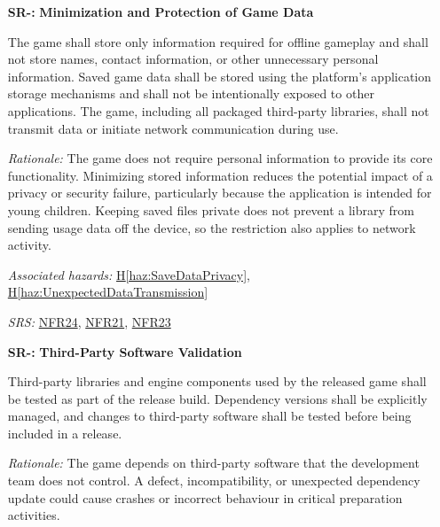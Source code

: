 \documentclass{article}
\newcounter{hazard}
\newcommand{\hazref}[1]{\hyperref[haz:#1]{H\ref*{haz:#1}}}
\newcounter{sr}
\newcommand{\srdef}[1]{\refstepcounter{sr}\label{sr:#1}\textbf{SR-\thesr:}}
\newcommand{\srsurl}{https://team-hindsight.github.io/ophthamology-game/SRS-IEEE/SRS.pdf}
\newcommand{\srsfrref}[2]{\href{\srsurl\#nameddest=#1}{FR#2}}
\newcommand{\srsnfrref}[2]{\href{\srsurl\#nameddest=#1}{NFR#2}}
\begin{document}
\begin{itemize}[leftmargin=1.5cm, labelwidth=1.3cm, labelsep=0.2cm,
  align=left, itemsep=1.2em, parsep=0.6em]
\textit{Rationale:}
Corrupted save data could cause the child to
lose completed preparation activities and rewards.
Protecting valid saved progress reduces the
frustration and loss of functionality caused by
unexpected application or device failures.

\textit{Associated hazards:}
\hazref{SaveDataCorruption}

\textit{SRS:} \srsfrref{FR_PersistState}{25}, \srsfrref{FR_CorruptData}{26}; \srsnfrref{NFR_Reliability}{14}

\item[\srdef{MinimalSaveData}]
\textbf{Minimization and Protection of Game Data}

The game shall store only information required
for offline gameplay and shall not store names,
contact information, or other unnecessary
personal information. Saved game data shall be
stored using the platform's application storage
mechanisms and shall not be intentionally exposed
to other applications.
The game, including all packaged third-party libraries,
shall not transmit data or initiate network communication
during use.

\textit{Rationale:}
The game does not require personal information
to provide its core functionality. Minimizing
stored information reduces the potential impact
of a privacy or security failure, particularly
because the application is intended for young
children.
Keeping saved files private does not prevent a library
from sending usage data off the device, so the restriction
also applies to network activity.

\textit{Associated hazards:}
\hazref{SaveDataPrivacy}, \hazref{UnexpectedDataTransmission}

\textit{SRS:} \srsnfrref{NFR_Minimization}{24}, \srsnfrref{NFR_DataProtection}{21}, \srsnfrref{NFR_Privacy}{23}

\item[\srdef{ThirdPartyValidation}]
\textbf{Third-Party Software Validation}

Third-party libraries and engine components
used by the released game shall be tested as
part of the release build. Dependency versions
shall be explicitly managed, and changes to
third-party software shall be tested before
being included in a release.

\textit{Rationale:}
The game depends on third-party software that
the development team does not control. A defect,
incompatibility, or unexpected dependency update
could cause crashes or incorrect behaviour in
critical preparation activities.


\end{itemize}
\end{document}
